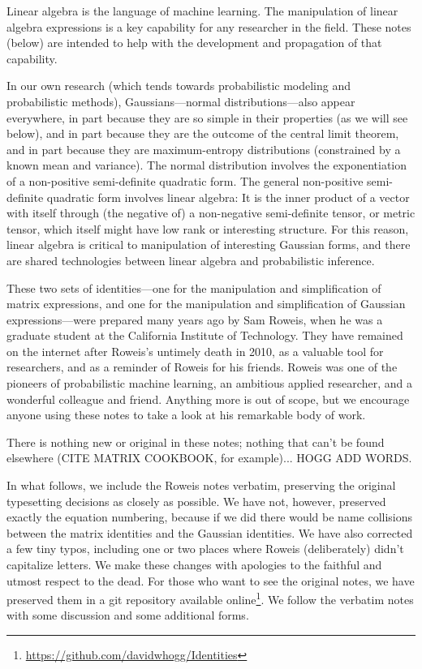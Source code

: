 \documentclass[12pt]{article}
\begin{document}
Linear algebra is the language of machine learning.
The manipulation of linear algebra expressions is a key capability for
any researcher in the field.
These notes (below) are intended to help with the development and
propagation of that capability.

In our own research (which tends towards probabilistic modeling and
probabilistic methods), Gaussians---normal distributions---also appear
everywhere, in part because they are so simple in their properties
(as we will see below), and in part because
they are the outcome of the central limit theorem, and in part
because they are maximum-entropy distributions (constrained by
a known mean and variance).
The normal distribution involves the exponentiation of a
non-positive semi-definite quadratic form.
The general non-positive semi-definite quadratic form involves linear
algebra:
It is the inner product of a vector with itself through (the negative
of) a non-negative semi-definite tensor, or metric tensor, which
itself might have low rank or interesting structure.
For this reason, linear algebra is critical to manipulation of
interesting Gaussian forms, and there are shared technologies between
linear algebra and probabilistic inference.

These two sets of identities---one for the manipulation and
simplification of matrix expressions, and one for the manipulation and
simplification of Gaussian expressions---were prepared many years ago
by Sam Roweis, when he was a graduate
student at the California Institute of Technology.
They have remained on the internet after Roweis's untimely death in 2010,
as a valuable tool for researchers, and as a reminder of Roweis for his
friends.
Roweis was one of the pioneers of probabilistic machine learning, an ambitious
applied researcher, and a wonderful colleague and friend.
Anything more is out of scope, but we encourage anyone using these notes to
take a look at his remarkable body of work.

There is nothing new or original in these notes; nothing that can't be found
elsewhere (CITE MATRIX COOKBOOK, for example)... HOGG ADD WORDS.

In what follows, we include the Roweis notes verbatim, preserving
the original typesetting decisions as closely as possible.
We have not, however, preserved exactly the equation numbering,
because if we did there would be name collisions between the matrix identities
and the Gaussian identities.
We have also corrected a few tiny typos, including one or two places where
Roweis (deliberately) didn't capitalize letters.
We make these changes with apologies to the faithful and utmost respect to the dead.
For those who want to see the original notes, we have preserved them in a git
repository available online\footnote{\url{https://github.com/davidwhogg/Identities}}.
We follow the verbatim notes with some discussion and some additional forms.
\end{document}

